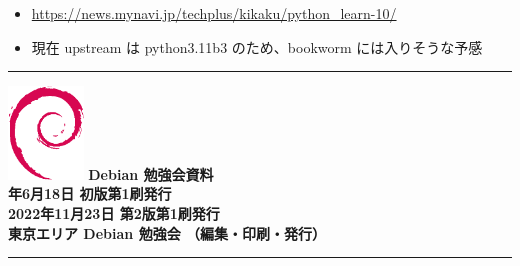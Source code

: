 \documentclass[mingoth,a4paper]{jsarticle}
\newcommand{\debmtgyear}{2022}
\newcommand{\debmtgmonth}{6}
\newcommand{\debmtgdate}{18}
\begin{document}

\begin{itemize}
\item \url{https://news.mynavi.jp/techplus/kikaku/python_learn-10/}
\item 現在 upstream は python3.11b3 のため、bookworm には入りそうな予感
\end{itemize}


\mbox{}\newpage

\vspace*{15cm}
\hrule
\vspace{2mm}
\includegraphics[width=2cm]{image-assets/openlogo-nd.eps}
\noindent \Large \bf Debian 勉強会資料\\
\noindent \normalfont \debmtgyear{}年\debmtgmonth{}月\debmtgdate{}日 \hspace{5mm}  初版第1刷発行\\
\noindent \normalfont 2022年11月23日 \hspace{5mm}  第2版第1刷発行\\
\noindent \normalfont 東京エリア Debian 勉強会 （編集・印刷・発行）\\
\hrule
\end{document}
